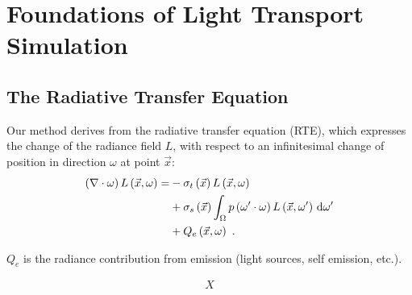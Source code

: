 \chapter{Foundations of Light Transport Simulation}
\label{sec:foundations}


\section{The Radiative Transfer Equation}



Our method derives from the radiative transfer equation (RTE), which expresses the change of the radiance field $L$, with respect to an infinitesimal change of position in direction $\omega$ at point $\vec{x}$:
\begin{align}
\left(\nabla\cdot\omega\right)L\left(\vec{x}, \omega \right)
=&
-\sigma_t\left(\vec{x}\right) L\left(\vec{x}, \omega \right)\nonumber\\
&
+\sigma_s\left(\vec{x}\right) \int_{\Omega}
{
p\left(\omega'\cdot\omega\right)L\left(\vec{x}, \omega' \right)\,\mathrm{d}\omega'
}
\label{eq:rte}
\\
&
+Q_e\left(\vec{x}, \omega\right)
\nonumber
\  .
\end{align}

$Q_e$ is the radiance contribution from emission (light sources, self emission, etc.).



\begin{align}
\label{eq:foundations_mean_cosine}
X
\end{align}






